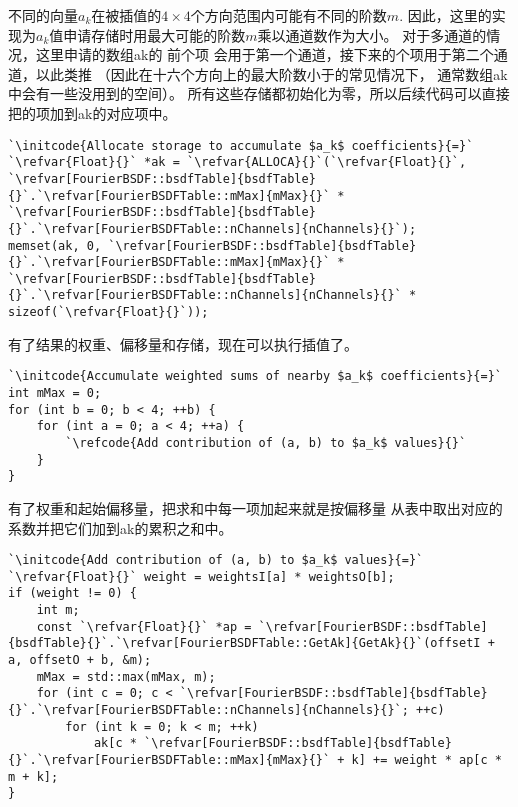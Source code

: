 不同的向量$a_k$在被插值的$4\times4$个方向范围内可能有不同的阶数$m$.
因此，这里的实现为$a_k$值申请存储时用最大可能的阶数$m$乘以通道数作为大小。
对于多通道的情况，这里申请的数组{\ttfamily ak}的
前个项
会用于第一个通道，接下来的个项用于第二个通道，以此类推
（因此在十六个方向上的最大阶数小于的常见情况下，
通常数组{\ttfamily ak}中会有一些没用到的空间）。
所有这些存储都初始化为零，所以后续代码可以直接把的项加到{\ttfamily ak}的对应项中。
\begin{lstlisting}
`\initcode{Allocate storage to accumulate $a_k$ coefficients}{=}`
`\refvar{Float}{}` *ak = `\refvar{ALLOCA}{}`(`\refvar{Float}{}`, `\refvar[FourierBSDF::bsdfTable]{bsdfTable}{}`.`\refvar[FourierBSDFTable::mMax]{mMax}{}` * `\refvar[FourierBSDF::bsdfTable]{bsdfTable}{}`.`\refvar[FourierBSDFTable::nChannels]{nChannels}{}`);
memset(ak, 0, `\refvar[FourierBSDF::bsdfTable]{bsdfTable}{}`.`\refvar[FourierBSDFTable::mMax]{mMax}{}` * `\refvar[FourierBSDF::bsdfTable]{bsdfTable}{}`.`\refvar[FourierBSDFTable::nChannels]{nChannels}{}` * sizeof(`\refvar{Float}{}`));
\end{lstlisting}

有了结果的权重、偏移量和存储，现在可以执行插值了。
\begin{lstlisting}
`\initcode{Accumulate weighted sums of nearby $a_k$ coefficients}{=}`
int mMax = 0;
for (int b = 0; b < 4; ++b) {
    for (int a = 0; a < 4; ++a) {
        `\refcode{Add contribution of (a, b) to $a_k$ values}{}`
    }
}
\end{lstlisting}

有了权重和起始偏移量，把求和中每一项加起来就是按偏移量
从表中取出对应的系数并把它们加到{\ttfamily ak}的累积之和中。
\begin{lstlisting}
`\initcode{Add contribution of (a, b) to $a_k$ values}{=}`
`\refvar{Float}{}` weight = weightsI[a] * weightsO[b];
if (weight != 0) {
    int m;
    const `\refvar{Float}{}` *ap = `\refvar[FourierBSDF::bsdfTable]{bsdfTable}{}`.`\refvar[FourierBSDFTable::GetAk]{GetAk}{}`(offsetI + a, offsetO + b, &m);
    mMax = std::max(mMax, m);
    for (int c = 0; c < `\refvar[FourierBSDF::bsdfTable]{bsdfTable}{}`.`\refvar[FourierBSDFTable::nChannels]{nChannels}{}`; ++c)
        for (int k = 0; k < m; ++k)
            ak[c * `\refvar[FourierBSDF::bsdfTable]{bsdfTable}{}`.`\refvar[FourierBSDFTable::mMax]{mMax}{}` + k] += weight * ap[c * m + k];
}
\end{lstlisting}

